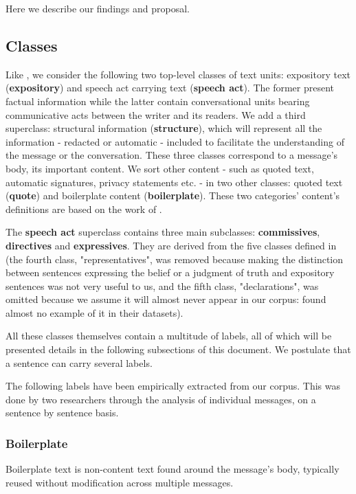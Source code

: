 \documentclass[11pt]{article}
\begin{document}
Here we describe our findings and proposal.

\subsection{Classes}

Like \cite{qadir2011classifying}, we consider the following two top-level classes of text units: expository text (\textbf{expository}) and speech act carrying text (\textbf{speech act}). The former present factual information while the latter contain conversational units bearing communicative acts between the writer and its readers. We add a third superclass: structural information (\textbf{structure}), which will represent all the information - redacted or automatic - included to facilitate the understanding of the message or the conversation. These three classes correspond to a message's body, its important content. We sort other content - such as quoted text, automatic signatures, privacy statements etc. - in two other classes: quoted text (\textbf{quote}) and boilerplate content (\textbf{boilerplate}). These two categories' content's definitions are based on the work of \cite{lampert2009segmenting}.

The \textbf{speech act} superclass contains three main subclasses: \textbf{commissives}, \textbf{directives} and \textbf{expressives}. They are derived from the five classes defined in \cite{searle1976taxonomy} (the fourth class, "representatives", was removed because making the distinction between sentences expressing the belief or a judgment of truth and expository sentences was not very useful to us, and the fifth class, "declarations", was omitted because we assume it will almost never appear in our corpus: \cite{qadir2011classifying} found almost no example of it in their datasets).

All these classes themselves contain a multitude of labels, all of which will be presented details in the following subsections of this document. We postulate that a sentence can carry several labels.

The following labels have been empirically extracted from our corpus. This was done by two researchers through the analysis of individual messages, on a sentence by sentence basis.

\subsubsection{Boilerplate}

Boilerplate text is non-content text found around the message's body, typically reused without modification across multiple messages.
\end{document}
